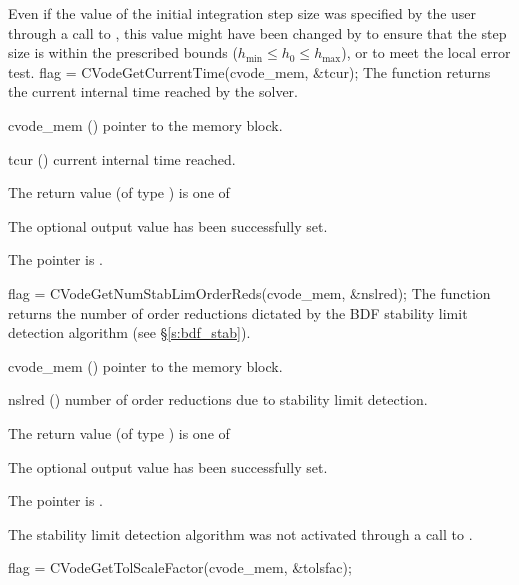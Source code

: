 {
  Even if the value of the initial integration step size was specified
  by the user through a call to , this value might have 
  been changed by {\cvode} to ensure that the step size is within the 
  prescribed bounds ($h_{\min} \le h_0 \le h_{\max}$), or to meet the
  local error test.
}
{
  flag = CVodeGetCurrentTime(cvode\_mem, \&tcur);
}
{
  The function  returns the
  current internal time reached by the solver.
}
{
  \begin{args}
  \item[cvode\_mem] ()
    pointer to the {\cvode} memory block.
  \item[tcur] ()
    current internal time reached.
  \end{args}
}
{
  The return value  (of type ) is one of
  \begin{args}
  \item[\Id{CV\_SUCCESS}] 
    The optional output value has been successfully set.
  \item[\Id{CV\_MEM\_NULL}]
    The  pointer is .
  \end{args}
}
{}
{
  flag = CVodeGetNumStabLimOrderReds(cvode\_mem, \&nslred);
}
{
  The function  returns the
  number of order reductions dictated by the BDF stability limit 
  detection algorithm (see \S\ref{s:bdf_stab}).
}
{
  \begin{args}
  \item[cvode\_mem] ()
    pointer to the {\cvode} memory block.
  \item[nslred] ()
    number of order reductions due to stability limit detection.
  \end{args}
}
{
  The return value  (of type ) is one of
  \begin{args}[CV\_NO\_SLDET]
  \item[\Id{CV\_SUCCESS}] 
    The optional output value has been successfully set.
  \item[\Id{CV\_MEM\_NULL}]
    The  pointer is .
  \item[\Id{CV\_NO\_SLDET}]
    The stability limit detection algorithm was not activated 
    through a call to .
  \end{args}
}
{}
{
  flag = CVodeGetTolScaleFactor(cvode\_mem, \&tolsfac);
}
